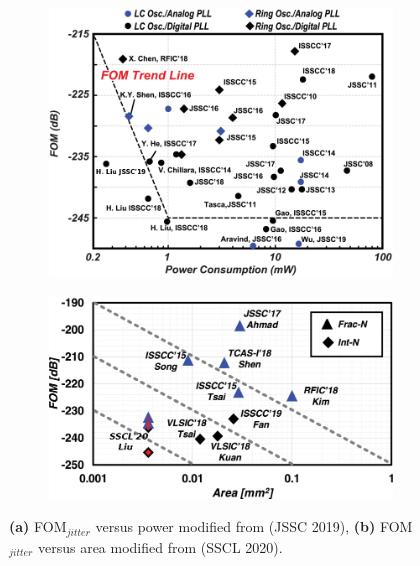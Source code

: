 	\begin{figure}[htb!]
	    \centering
	    \begin{subfigure}{0.5\textwidth}
	        \centering
	        \includegraphics[width=1\textwidth, angle=0]{./figs/liu24-fom2}
	        \caption{ }
	        \label{fig:fom_v_pow}
	    \end{subfigure}%
	    \begin{subfigure}{0.5\textwidth}
	        \centering
	        \includegraphics[width=1\textwidth, angle=0]{./figs/liu_5nm2}
	        \caption{ }
	        \label{fig:fom_v_area}
	    \end{subfigure}
	    \caption{\textbf{(a)} FOM$_{jitter}$ versus power modified from \cite{Liu2019} (JSSC 2019), \textbf{(b)} FOM$_{jitter}$ versus area modified from \cite{Liu2020} (SSCL 2020).}
	    \label{fig:fom_charts}
	\end{figure}


